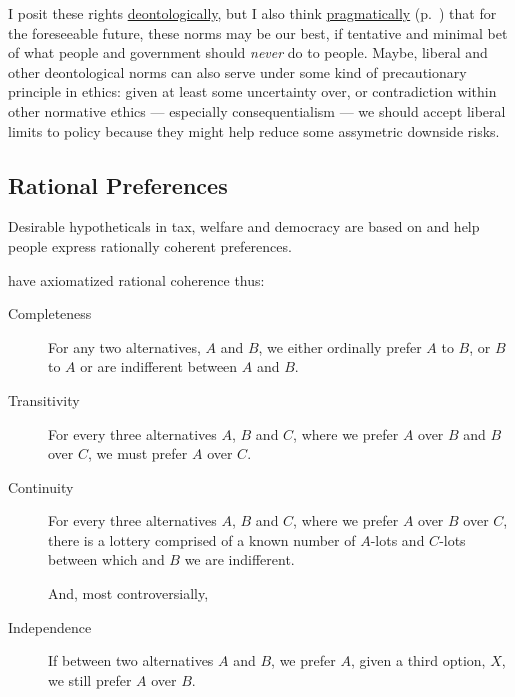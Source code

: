 I posit these rights \hyperref[sec:deontological]{deontologically}, but I also think \hyperref[itm:pragmatic-ethics]{pragmatically} (p.~\pageref{itm:pragmatic-ethics}) that for the foreseeable future, these norms may be our best, if tentative and minimal bet of what people and government should \emph{never} do to people.
Maybe, liberal and other deontological norms can also serve under some kind of precautionary principle in ethics: given at least some uncertainty over, or contradiction within other normative ethics --- especially consequentialism --- we should accept liberal limits to policy because they might help reduce some assymetric downside risks.

\subsection[Rational]{Rational Preferences} \label{sec:rational} %
Desirable hypotheticals in tax, welfare and democracy are based on and help people express rationally coherent preferences.

\cite{VonNeumannMorgenstern1944} have axiomatized rational coherence thus:
\begin{description}
	\item[Completeness  \label{itm:completeness}] For any two alternatives, $A$ and $B$, we either ordinally prefer $A$ to $B$, or $B$ to $A$ or are indifferent between $A$ and $B$.
	\item[Transitivity  \label{itm:transitivity}] For every three alternatives $A$, $B$ and $C$, where we prefer $A$ over $B$ and $B$ over $C$, we must prefer $A$ over $C$.
	\item[Continuity  \label{itm:continuity}] For every three alternatives	$A$, $B$ and $C$, where we prefer $A$ over $B$ over $C$, there is a lottery comprised of a known number of $A$-lots and $C$-lots between which and $B$ we are indifferent.

	And, most controversially,

	\item[Independence  \label{itm:independence}] If between two alternatives $A$ and $B$, we prefer $A$, given a third option, $X$, we still prefer $A$ over $B$.
\end{description}

